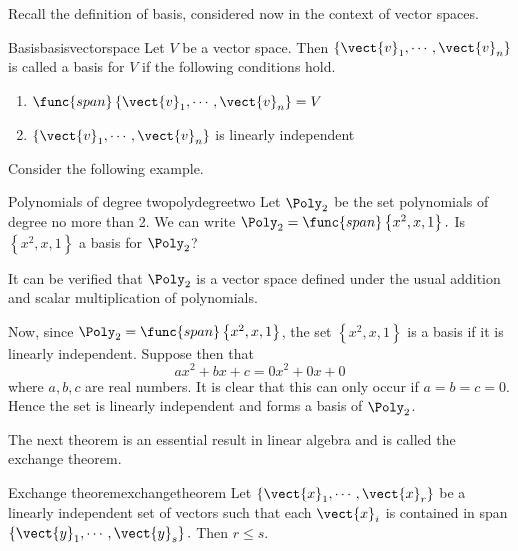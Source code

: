 Recall the definition of basis, considered now in the context of vector spaces.

\begin{definition}{Basis}{basisvectorspace}
Let $V$ be a vector space. Then $\{\vect{v}_{1},\cdots ,\vect{v}_{n}\}$ is called a basis for $V$ if the following conditions hold.
\begin{enumerate}
\item
$\func{span}\left\{ \vect{v}_{1},\cdots ,\vect{v}_{n}\right\} = V$
\item
$\{\vect{v}_{1},\cdots ,\vect{v}_{n}\}$ is linearly independent
\end{enumerate}
\end{definition}

Consider the following example.

\begin{example}{Polynomials of degree two}{polydegreetwo}
Let $\Poly_2$ be the set polynomials of degree no more than 2. We can write
$\Poly_2=\func{span}\left\{ x^{2}, x, 1\right\} .$ Is $\left\{ x^{2}, x, 1\right\} $ a
basis for $\Poly_2$?
\end{example}

\begin{solution}
It can be verified that $\Poly_2$ is a vector space defined under the usual addition and scalar multiplication of polynomials. 

Now, since $\Poly_2=\func{span}\left\{ x^{2},x, 1\right\}$, the set  $\left\{ x^{2}, x, 1\right\} $ is a basis if it is linearly independent. Suppose then that 
\begin{equation*}
ax^{2}+bx+c=0x^2 + 0x + 0 
\end{equation*}
where $a,b,c$ are real numbers. It is clear that this can only occur if $a=b=c=0$. Hence the set is linearly independent and forms a basis of $\Poly_2$.
\end{solution}

The next theorem is an essential result in linear algebra and is called the exchange theorem.

\begin{theorem}{Exchange theorem}{exchangetheorem}
Let $\left\{ \vect{x}_{1},\cdots ,\vect{x}_{r}\right\} $
be a linearly independent set of vectors such that each $\vect{x}_{i}$ is
contained in span$\left\{ \vect{y}_{1},\cdots ,\vect{y}_{s}\right\} .$ Then $
r\leq s.$
\end{theorem}


